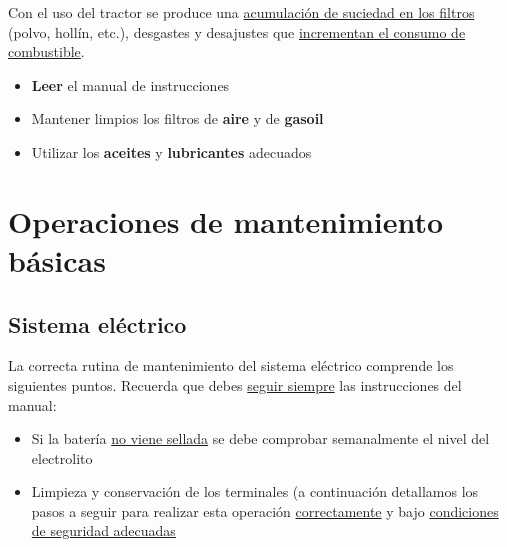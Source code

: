 \documentclass[a4paper,12pt,oneside]{book}
\begin{document}
Con el uso del tractor se produce una \uline{acumulación de suciedad en los filtros}
(polvo, hollín, etc.), desgastes y desajustes que \uline{incrementan el consumo de
combustible}.

\begin{center}%
\end{center}

\begin{itemize}
\item \textbf{Leer} el manual de instrucciones
\item Mantener limpios los filtros de \textbf{aire} y de \textbf{gasoil}
\item Utilizar los \textbf{aceites} y \textbf{lubricantes} adecuados
\end{itemize}

\section{Operaciones de mantenimiento básicas}
\label{sec:orgf3c0e55}

\subsection{Sistema eléctrico}
\label{sec:orga2b5e1e}
La correcta rutina de mantenimiento del sistema eléctrico comprende los
siguientes puntos. Recuerda que debes \uline{seguir siempre} las instrucciones del manual:

\begin{itemize}
\item Si la batería \uline{no viene sellada} se debe comprobar semanalmente el nivel del electrolito
\item Limpieza y conservación de los terminales (a continuación detallamos los pasos
a seguir para realizar esta operación \uline{correctamente} y bajo \uline{condiciones de 
seguridad adecuadas}
\end{itemize}
\end{document}
